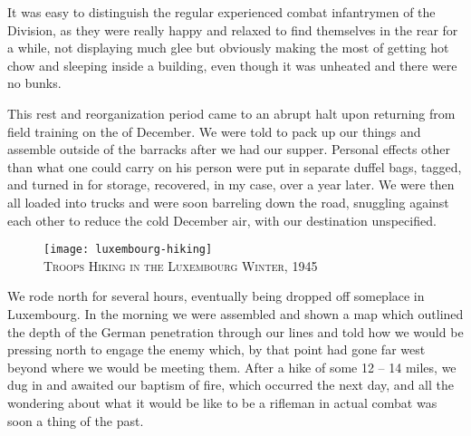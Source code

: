 \documentclass[../m3y]{subfiles}
\begin{document}
It was easy to distinguish the regular experienced combat infantrymen of the  Division, as they were really happy and relaxed to find themselves in the rear for a while, not displaying much glee but obviously making the most of getting hot chow and sleeping inside a building, even though it was unheated and there were no bunks.

This rest and reorganization period came to an abrupt halt upon returning from field training on the  of December. We were told to pack up our things and assemble outside of the barracks after we had our supper. Personal effects other than what one could carry on his person were put in separate duffel bags, tagged, and turned in for storage, recovered, in my case, over a year later. We were then all loaded into trucks and were soon barreling down the road, snuggling against each other to reduce the cold December air, with our destination unspecified.

\begin{figure}[t]
\centering
\texttt{[image: luxembourg-hiking]}\\
\medskip
{\newtimes\textsc{Troops Hiking in the Luxembourg Winter, 1945}}
\end{figure}

We rode north for several hours, eventually being dropped off someplace in Luxembourg. In the morning we were assembled and shown a map which outlined the depth of the German penetration through our lines and told how we would be pressing north to engage the enemy which, by that point had gone far west beyond where we would be meeting them. After a hike of some 12 -- 14 miles, we dug in and awaited our baptism of fire, which occurred the next day, and all the wondering about what it would be like to be a rifleman in actual combat was soon a thing of the past.
\end{document}
